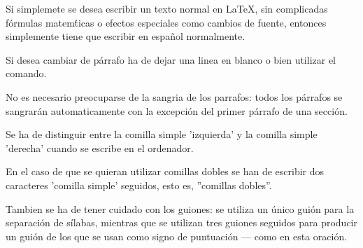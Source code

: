 \documentclass[a4paper,10pt]{letter}
\begin{document}
Si simplemete se desea escribir un texto normal en LaTeX,
sin complicadas f\'ormulas matem\'ticas o efectos especiales
como cambios de fuente, entonces simplemente tiene que escribir
en espa\~nol normalmente.\par
Si desea cambiar de párrafo ha de dejar una linea en blanco o bien
utilizar el comando.\par
No es necesario preocuparse de la sangria de los parrafos:
todos los párrafos se sangrarán automaticamente con la excepción
del primer párrafo de una sección.

Se ha de distinguir entre la comilla simple 'izquierda'
y la comilla simple 'derecha' cuando se escribe en el ordenador.

En el caso de que se quieran utilizar comillas dobles se han de
escribir dos caracteres 'comilla simple' seguidos, esto es,
''comillas dobles''.

Tambien se ha de tener cuidado con los guiones: se utiliza un único
guión para la separación de sílabas, mientras que se utilizan
tres guiones seguidos para producir un guión de los que se usan
como signo de puntuación --- como en esta oración.
\end{document}
